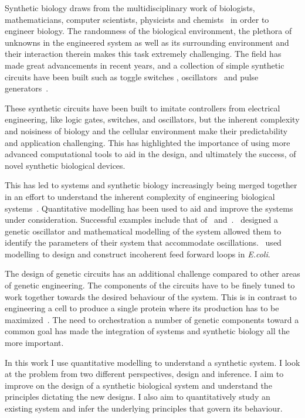 Synthetic biology draws from the multidisciplinary work of biologists, mathematicians, computer scientists, physicists and chemists~\autocite{Vinson:2011hu} in order to engineer biology. The randomness of the biological environment, the plethora of unknowns in the engineered system as well as its surrounding environment and their interaction therein makes this task extremely challenging. The field has made great advancements in recent years, and a collection of simple synthetic circuits have been built such as toggle switches \autocite{Gardner:2000vha, Kramer:2004kq, Isaacs:2003hta, Ham:2008hh, Deans:2007cy, Friedland:2009ce}, oscillators~\autocite{Stricker:2008jqa, Fung:2005jd, Tigges:2009jx} and pulse generators~\autocite{Basu:2004gn}.  

These synthetic circuits have been built to imitate controllers from electrical engineering, like logic gates, switches, and oscillators, but the inherent complexity and noisiness of biology and the cellular environment make their predictability and application challenging. This has highlighted the importance of using more advanced computational tools to aid in the design, and ultimately the success, of novel synthetic biological devices. 

This has led to systems and synthetic biology increasingly being merged together in an effort to understand the inherent complexity of engineering biological systems~\autocite{Gramelsberger:2013iu}. Quantitative modelling has been used to aid and improve the systems under consideration. Successful examples include that of~\textcite{Stricker:2008jqa} and~\textcite{Entus:wy}.~\textcite{Stricker:2008jqa}  designed a genetic oscillator and mathematical modelling of the system allowed them to identify the parameters of their system that accommodate oscillations.~\textcite{Entus:wy} used modelling to design and construct incoherent feed forward loops in \textit{E.coli}.   

The design of genetic circuits has an additional challenge compared to other areas of genetic engineering. The components of the circuits have to be finely tuned to work together towards the desired behaviour of the system. This is in contrast to engineering a cell to produce a single protein where its production has to be maximized~\autocite{Nielsen:2013hs}. The need to orchestration a number of genetic components toward a common goal has made the integration of systems and synthetic biology all the more important.


In this work I use quantitative modelling to understand a synthetic system. I look at the problem from two different perspectives, design and inference. I aim to improve on the design of a synthetic biological system and understand the principles dictating the new designs. I also aim to quantitatively study an existing system and infer the underlying principles that govern its behaviour. 



